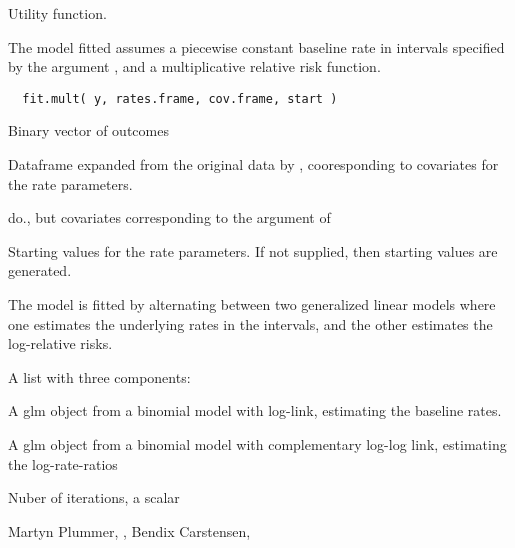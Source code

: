 \begin{Description}\relax
Utility function.

The model fitted assumes a piecewise constant baseline rate in
intervals specified by the argument , and a
multiplicative relative risk function.
\end{Description}
\begin{Usage}
\begin{verbatim}
  fit.mult( y, rates.frame, cov.frame, start )
  \end{verbatim}
\end{Usage}
\begin{Arguments}
\begin{ldescription}
\item[\code{y}] Binary vector of outcomes
\item[\code{rates.frame}] Dataframe expanded from the original data by
, cooresponding to covariates for the rate
parameters.
\item[\code{cov.frame}] do., but covariates corresponding to the
 argument of 
\item[\code{start}] Starting values for the rate parameters. If not supplied,
then starting values are generated.
\end{ldescription}
\end{Arguments}
\begin{Details}\relax
The model is fitted by alternating between two generalized linear
models where one estimates the underlying rates in the intervals, and
the other estimates the log-relative risks.
\end{Details}
\begin{Value}
A list with three components:
\begin{ldescription}
\item[\code{rates}] A glm object from a binomial model with log-link,
estimating the baseline rates.
\item[\code{cov}] A glm object from a binomial model with complementary
log-log link, estimating the log-rate-ratios
\item[\code{niter}] Nuber of iterations, a scalar
\end{ldescription}
\end{Value}
\begin{Author}\relax
Martyn Plummer, ,
Bendix Carstensen, 
\end{Author}
